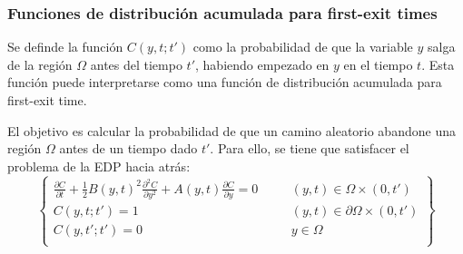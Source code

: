 \subsubsection{Funciones de distribución acumulada para first-exit times}
Se definde la función $C(y, t; t')$ como la probabilidad de que la variable $y$ salga de la región $\Omega$ antes del tiempo $t'$, habiendo empezado en $y$ en el tiempo $t$. Esta función puede interpretarse como una función de distribución acumulada para first-exit time. 

El objetivo es calcular la probabilidad de que un camino aleatorio abandone una región $\Omega$ antes de un tiempo dado $t'$. Para ello, se tiene que satisfacer el problema de la EDP hacia atrás:
\begin{equation}\label{eq:CumulatFirstExitTime}
    \left\{
    \begin{array}{rlrl}
        \displaystyle\frac{\partial C}{\partial t} + \frac{1}{2} B(y, t)^2 \frac{\partial^2 C}{\partial y^2} + A(y, t) \frac{\partial C}{\partial y} = 0 &\quad& (y,t) \in \Omega\times(0, t') \\[2ex]
        C(y, t; t') = 1 && (y,t) \in \partial\Omega\times(0, t') \\[2ex]
        C(y, t'; t') = 0 && y \in \Omega \\
    \end{array}
    \right\}
\end{equation}




